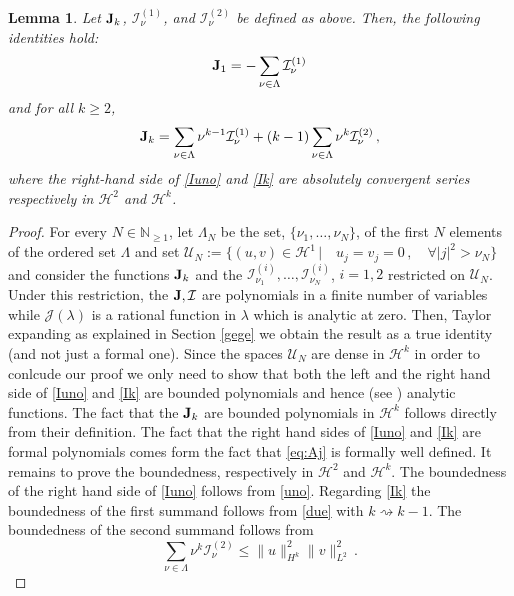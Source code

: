 \documentclass[reqno,11pt]{amsart}
\theoremstyle{plain}
\numberwithin{equation}{section}
\newtheorem{lemma}[theorem]{Lemma}
\newcommand{\N}{\mathbb{N}}
\renewcommand{\H}{\mathcal{H}}
\newcommand{\I}{{\texttt{\bf J}}}
\newcommand{\cI}{{\mathcal I}}
\begin{document}
{%
\begin{lemma}\label{Iinverso}
Let $\I_k$, $\mathcal I^{(1)}_\nu$, and $\mathcal I^{(2)}_\nu$ be defined as above. Then, the following identities hold:
\begin{equation}\label{Iuno}
	\I_1 = -\sum_{\nu \in \Lambda} \mathcal I^{(1)}_\nu
\end{equation}
and for all $k \geq 2$,
\begin{equation}\label{Ik}
	\I_k = \sum_{\nu \in \Lambda} \nu^{k-1} \mathcal I^{(1)}_\nu + (k-1) \sum_{\nu \in \Lambda} \nu^{k} \mathcal I^{(2)}_\nu\,,
\end{equation}
where the right-hand side of \eqref{Iuno} and \eqref{Ik} are absolutely convergent series respectively in $\H^{2}$ and $\H^{k}$.
\end{lemma}

\begin{proof}
	For every $N\in\N_{\geq 1}$, let $\Lambda_N$ be the set, $\{\nu_1,\ldots,\nu_N\}$, of the first $N$ elements of the ordered set $\Lambda$ and set $\mathscr{U}_N:=\{ (u,v)\in \H^1\,\vert{} \quad u_j=v_j=0\,,\quad \forall |j|^2>\nu_N\}$ and consider the functions $\I_k$ and the  $\cI^{(i)}_{\nu_1},\ldots,\cI^{(i)}_{\nu_N}$, $i=1,2$ restricted on $\mathscr{U}_N$.\\
	Under this restriction,  the $\I,\cI$ are polynomials in a finite number of variables while $\mathcal{J}(\lambda)$ is a rational function in $\lambda$ which is analytic at zero. Then, Taylor expanding as explained in Section \ref{gege} we obtain the result as a true identity (and not just a formal one).
	Since the spaces $\mathscr{U}_N$ are dense in $\H^k$ in order to conlcude our proof we only need to show that both the left and the right hand side of \eqref{Iuno} and \eqref{Ik} are bounded polynomials and hence (see \cite{muj})  analytic functions. The fact that the $\I_k$ are bounded polynomials  in $\H^k$ follows directly from their definition. The fact that the right hand sides of  \eqref{Iuno} and \eqref{Ik} are formal polynomials comes form the fact that \eqref{eq:Aj} is formally well defined. It remains to prove the boundedness, respectively in $\H^2$ and $\H^k$.  The boundedness of the right hand side of \eqref{Iuno} follows from \eqref{uno}. Regarding \eqref{Ik} the boundedness of the first summand follows from \eqref{due} with $k\rightsquigarrow k-1$.  The boundedness of the second  summand follows from 
	\[
	\sum_{\nu\in\Lambda}\nu^k \cI^{(2)}_\nu \leq \|u\|_{H^k}^2\|v\|_{L^2}^2\,.
	\]
	

\end{proof}}
\end{document}
